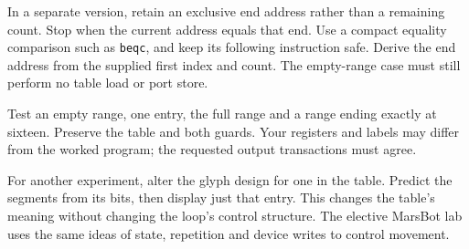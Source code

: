 In a separate version, retain an exclusive end address rather than a remaining
count. Stop when the current address equals that end. Use a compact equality
comparison such as \texttt{beqc}, and keep its following instruction safe. Derive
the end address from the supplied first index and count. The empty-range case
must still perform no table load or port store.

Test an empty range, one entry, the full range and a range ending exactly at
sixteen. Preserve the table and both guards. Your registers and labels may differ
from the worked program; the requested output transactions must agree.

For another experiment, alter the glyph design for one in the table. Predict the
segments from its bits, then display just that entry. This changes the table's
meaning without changing the loop's control structure. The elective MarsBot lab
uses the same ideas of state, repetition and device writes to control movement.
